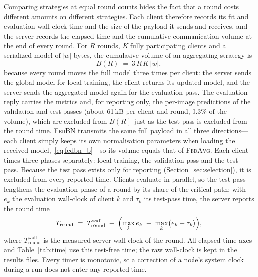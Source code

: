 \documentclass[journal]{IEEEtran}
\newcommand{\fedavg}{\textsc{FedAvg}}
\newcommand{\fedbn}{\textsc{FedBN}}
\begin{document}
Comparing strategies at equal round counts hides the fact that a round costs different amounts on different strategies. Each client therefore records its fit and evaluation wall-clock time and the size of the payload it sends and receives, and the server records the elapsed time and the cumulative communication volume at the end of every round. For $R$ rounds, $K$ fully participating clients and a serialized model of $|w|$ bytes, the cumulative volume of an aggregating strategy is
\begin{equation}
B(R) \;=\; 3\,R\,K\,|w| ,
\label{eq:comm}
\end{equation}
because every round moves the full model three times per client: the server sends the global model for local training, the client returns its updated model, and the server sends the aggregated model again for the evaluation pass. The evaluation reply carries the metrics and, for reporting only, the per-image predictions of the validation and test passes (about 61\,kB per client and round, 0.3\% of the volume), which are excluded from $B(R)$ just as the test pass is excluded from the round time. \fedbn{} transmits the same full payload in all three directions---each client simply keeps its own normalisation parameters when loading the received model,~\eqref{eq:fedbn_b}---so its volume equals that of \fedavg{}. Each client times three phases separately: local training, the validation pass and the test pass. Because the test pass exists only for reporting (Section~\ref{sec:selection}), it is excluded from every reported time. Clients evaluate in parallel, so the test pass lengthens the evaluation phase of a round by its share of the critical path; with $e_k$ the evaluation wall-clock of client $k$ and $\tau_k$ its test-pass time, the server reports the round time
\[
T_{\mathrm{round}} \;=\; T_{\mathrm{round}}^{\mathrm{wall}} \;-\; \Bigl(\max_k e_k \;-\; \max_k \bigl(e_k - \tau_k\bigr)\Bigr),
\]
where $T_{\mathrm{round}}^{\mathrm{wall}}$ is the measured server wall-clock of the round. All elapsed-time axes and Table~\ref{tab:time} use this test-free time; the raw wall-clock is kept in the results files. Every timer is monotonic, so a correction of a node's system clock during a run does not enter any reported time.
\end{document}
